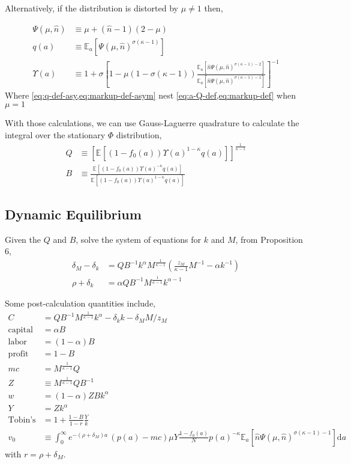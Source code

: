 \documentclass[12pt]{article}
\newcommand{\expec}[2][]{\ensuremath{\mathbb{E}_{{#1}}\left[ {#2} \right]}}
\newcommand{\diff}{\ensuremath{\mathrm{d}}}
\begin{document}
Alternatively, if the distribution is distorted by $\mu \neq 1$ then,

\begin{align}
	\Psi(\mu,\hat{n}) &\equiv \mu + (\hat{n} - 1)(2 - \mu)\label{eq:Psi-def}\\
	q(a) &\equiv \expec[a]{ \Psi(\mu, \hat{n})^{\sigma(\kappa - 1)}}\label{eq:q-def-asy}\\
	\Upsilon(a) &\equiv 	1 + \sigma\left[{1 - \mu(1-\sigma(\kappa-1))\frac{\expec[a]{\hat{n}\Psi(\mu, \hat{n})^{\sigma ( \kappa - 1) -2}}}{\expec[a]{\hat{n}\Psi(\mu, \hat{n})^{\sigma ( \kappa - 1)-1}}}} \right]^{-1}\label{eq:markup-def-asym}
\end{align}
Where \cref{eq:q-def-asy,eq:markup-def-asym} nest \cref{eq:a-Q-def,eq:markup-def} when $\mu = 1$


With those calculations, we can use Gauss-Laguerre quadrature to calculate the integral over the stationary $\Phi$ distribution,
\begin{align}
	Q &\equiv \left[\expec{(1 - f_0(a)) \Upsilon(a)^{1-\kappa} q(a)}\right]^{\frac{1}{\kappa-1}}\label{eq:Q-def}\\
	B &\equiv \frac{\expec{(1-f_0(a))\Upsilon(a)^{-\kappa}q(a)}}{\expec{(1 - f_0(a)) \Upsilon(a)^{1-\kappa} q(a)}}\label{eq:B-def}
\end{align}

\subsection{Dynamic Equilibrium}
Given the $Q$ and $B$, solve the system of equations for $k$ and $M$, from Proposition 6,
\begin{align}
	\delta_M - \delta_k &= Q B^{-1} k^{\alpha}M^{\frac{1}{\kappa - 1}}\left(\frac{z_M}{\kappa - 1}M^{-1} - \alpha k^{-1} \right)\label{eq:zeta-implicit-stationary}\\
   \rho  +  \delta_k &= \alpha Q B^{-1} M^{\frac{1}{\kappa - 1}}k^{\alpha-1}\label{eq:k-M-stationary}
  \end{align}

Some post-calculation quantities include,
\begin{align}
C &= Q B^{-1} M^{\frac{1}{\kappa - 1}} k^{\alpha} - \delta_k k - \delta_M M /z_M\\
\text{capital share} &= \alpha B\\
\text{labor share} &= (1-\alpha) B\\
\text{profit share} &= 1 - B\\
mc &= M^{\frac{1}{\kappa - 1}}Q\label{eq:mc-def}\\
Z &\equiv M^{\frac{1}{\kappa - 1}} Q B^{-1}\label{eq:Z-def}\\
w &= (1-\alpha)Z B k ^{\alpha}\\
Y &= Z k ^{\alpha} \\
		\text{Tobin's Q} &= 1 + \frac{1 - B}{1 - r} \frac{Y}{k} \\
v_0 &\equiv \int_0^{\infty}e^{-(\rho + \delta_M)a} \, (p(a) - mc)\mu Y\frac{1 - f_0(a)}{N}p(a)^{-\kappa}\expec[a]{\hat{n}\Psi(\mu, \hat{n})^{\sigma ( \kappa - 1)-1}}\diff a
\end{align}
with $r = \rho + \delta_M$.
\end{document}

